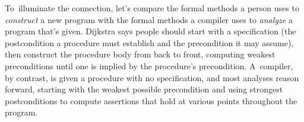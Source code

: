 \documentclass[blockstyle,preprint,nocopyrightspace]{sigplanconf}
\begin{document}

To~illuminate the connection, let's compare the formal methods a 
person uses to 
\emph{construct} a new program with the formal methods a compiler uses
to \emph{analyze} a program that's given.
Dijkstra says people should start with a specification (the postcondition a procedure
must establish and the precondition it may assume), then construct the
procedure body from back 
to front, computing weakest preconditions until one is implied by the
procedure's precondition. 
A~compiler, by contrast, is given a procedure with no specification,
and most analyses reason forward,  starting with the
weakest possible precondition and using strongest postconditions to
compute assertions that hold at various points throughout the program.
\end{document}
